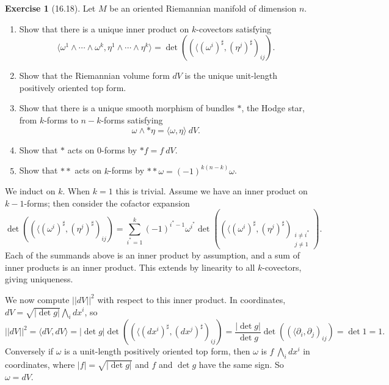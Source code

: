 \documentclass[10pt]{article}
\theoremstyle{definition}
\newtheorem{exer}{Exercise}
\begin{document}
\begin{exer}[16.18]
Let $M$ be an oriented Riemannian manifold of dimension $n$.
\begin{enumerate}
\item Show that there is a unique inner product on $k$-covectors satisfying
$$\langle \omega^1 \wedge \cdots \wedge \omega^k, \eta^1 \wedge \cdots \wedge \eta^k\rangle = \det((\langle (\omega^i)^\sharp, (\eta^j)^\sharp)_{ij}).$$
\item Show that the Riemannian volume form $dV$ is the unique unit-length positively oriented top form.
\item Show that there is a unique smooth morphism of bundles $*$, the Hodge star, from $k$-forms to $n-k$-forms satisfying
$$\omega \wedge *\eta = \langle \omega, \eta\rangle ~dV.$$
\item Show that $*$ acts on $0$-forms by $*f = f~dV$.
\item Show that $**$ acts on $k$-forms by $**\omega = (-1)^{k(n-k)}\omega$.
\end{enumerate}
\end{exer}

We induct on $k$. When $k = 1$ this is trivial. Assume we have an inner product on $k-1$-forms; then consider the cofactor expansion
$$\det((\langle (\omega^i)^\sharp, (\eta^j)^\sharp)_{ij}) = \sum_{i^*=1}^k (-1)^{i^* - 1} \omega^{i^*}\det((\langle (\omega^i)^\sharp, (\eta^j)^\sharp)_{\substack{i\neq i^*\\j \neq 1}}).$$
Each of the summands above is an inner product by assumption, and a sum of inner products is an inner product.
This extends by linearity to all $k$-covectors, giving uniqueness.

We now compute $||dV||^2$ with respect to this inner product. In coordinates, $dV = \sqrt{|\det g|} \bigwedge_i dx^i$, so
$$||dV||^2 = \langle dV, dV\rangle = |\det g| \det((\langle (dx^i)^\sharp, (dx^j)^\sharp)_{ij}) = \frac{|\det g|}{\det g} \det((\langle \partial_i, \partial_j)_{ij}) = \det 1 = 1.$$
Conversely if $\omega$ is a unit-length positively oriented top form, then $\omega$ is $f~\bigwedge_i dx^i$ in coordinates, where $|f| = \sqrt{|\det g|}$ and $f$ and $\det g$ have the same sign. So $\omega = dV$.
\end{document}

